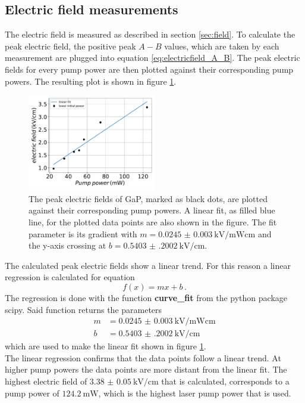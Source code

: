 \subsection{Electric field measurements}
\FloatBarrier
The electric field is measured as described in section \ref{sec:field}.
To calculate the peak electric field, the positive peak $A-B$ values, which are taken by each measurement are plugged into equation \eqref{eq:electricfield_A_B}.
The peak electric fields for every pump power are then plotted against their corresponding pump powers.
The resulting plot is shown in figure \ref{fig:gap_electricfield}.
\begin{figure}
    \centering
    \includegraphics[width=0.5\textwidth]{Plots/eltric_field_GaP.pdf}
    \caption{The peak electric fields of GaP, marked as black dots, are plotted against their corresponding pump powers.
    A linear fit, as filled blue line, for the plotted data points are also shown in the figure.
    The fit parameter is its gradient with $m=\SI{0.0245(30)}{\kilo\V\per\milli\W\centi\meter}$ and the y-axis crossing at $b=\SI{0.5403(2002)}{\kilo\V\per\centi\meter}$.}
    \label{fig:gap_electricfield}
\end{figure}
The calculated peak electric fields show a linear trend.
For this reason a linear regression is calculated for equation  
\begin{equation}
    f(x) = mx+b \,.
\end{equation}
The regression is done with the function \textbf{curve\_fit} from the python package scipy.
Said function returns the parameters
\begin{align*} 
    m &= \SI{0.0245(30)}{\kilo\V\per\milli\W\centi\meter}\\
    b &= \SI{0.5403(2002)}{\kilo\V\per\centi\meter}
\end{align*}
which are used to make the linear fit shown in figure \ref{fig:gap_electricfield}.
\\
The linear regression confirms that the data points follow a linear trend.
At higher pump powers the data points are more distant from the linear fit.
The highest electric field of $\SI{3.38(5)}{\kilo\V\per\centi\meter}$ that is calculated, corresponds to a pump power of $\SI{124.2}{\milli\W}$, which is the highest laser pump power that is used.
\FloatBarrier
